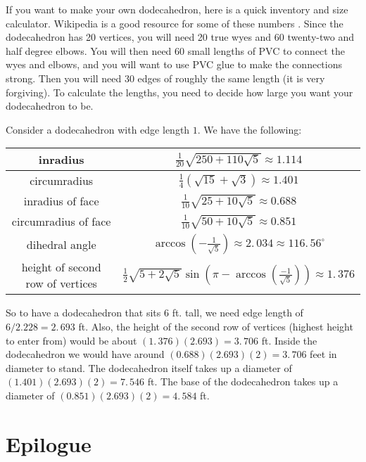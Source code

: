 \documentclass{article}
\begin{document}
If you want to make your own dodecahedron, here is a quick inventory and size
calculator. Wikipedia is a good resource for some of these numbers \cite{wik}.
Since the dodecahedron has 20 vertices, you will need 20 true wyes and 60
twenty-two and half degree elbows. You will then need 60 small lengths of PVC
to connect the wyes and elbows, and you will want to use PVC glue to make the
connections strong. Then you will need 30 edges of roughly the same length (it
is very forgiving). To calculate the lengths, you need to decide how large you
want your dodecahedron to be.

Consider a dodecahedron with edge length $1.$ We have the following:

\begin{center}%
\begin{tabular}
[c]{|c|c|}\hline
inradius & $\frac{1}{20}\sqrt{250+110\sqrt{5}}\approx1.114$\\\hline
circumradius & $\frac{1}{4}\left(  \sqrt{15}+\sqrt{3}\right)  \approx
1.401$\\\hline
inradius of face & $\frac{1}{10}\sqrt{25+10\sqrt{5}}\approx0.688$\\\hline
circumradius of face & $\frac{1}{10}\sqrt{50+10\sqrt{5}}\approx0.851$\\\hline
dihedral angle & $\arccos\left(  -\frac{1}{\sqrt{5}}\right)  \approx
2.\,034\approx116.\,56^{\circ}$\\\hline
height of second row of vertices & $\frac{1}{2}\sqrt{5+2\sqrt{5}}\sin\left(
\pi-\arccos\left(  \frac{-1}{\sqrt{5}}\right)  \right)  \approx1.\,376$%
\\\hline
\end{tabular}



\end{center}

\noindent So to have a dodecahedron that sits $6$ ft. tall, we need edge
length of $6/2.228=2.\,693$ ft. Also, the height of the second row of vertices
(highest height to enter from) would be about $\left(  1.\,376\right)  \left(
2.693\right)  =3.\,706$ ft. Inside the dodecahedron we would have around
$\left(  0.688\right)  \left(  2.693\right)  \left(  2\right)  =3.\,706$ feet
in diameter to stand. The dodecahedron itself takes up a diameter of $\left(
1.401\right)  \left(  2.693\right)  \left(  2\right)  =7.\,546$ ft. The base
of the dodecahedron takes up a diameter of $\left(  0.851\right)  \left(
2.693\right)  \left(  2\right)  =4.\,584$ ft.

\section{Epilogue}
\end{document}
